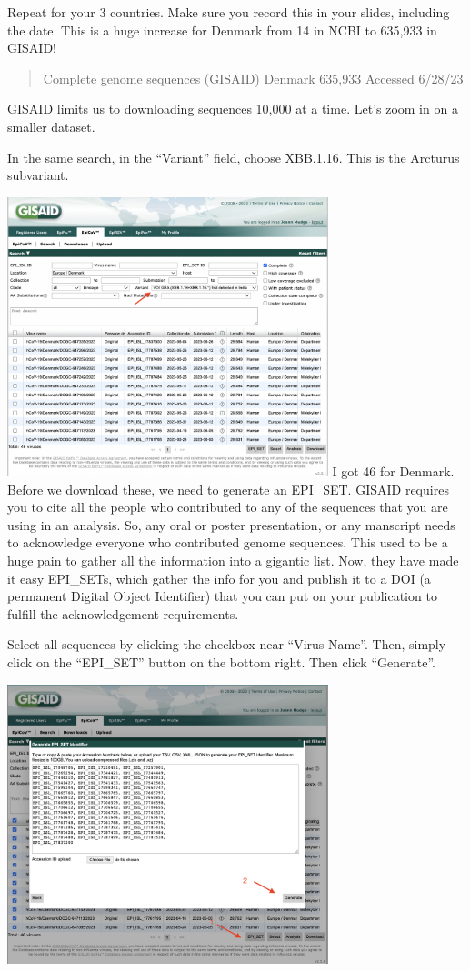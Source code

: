 \documentclass[
]{book}
\begin{document}
Repeat for your 3 countries. Make sure you record this in your slides, including the date. This is a huge increase for Denmark from 14 in NCBI to 635,933 in GISAID!

\begin{quote}
Complete genome sequences (GISAID)
Denmark 635,933
Accessed 6/28/23
\end{quote}

GISAID limits us to downloading sequences 10,000 at a time. Let's zoom in on a smaller dataset.

In the same search, in the ``Variant'' field, choose XBB.1.16. This is the Arcturus subvariant.

\includegraphics[width=0.7\textwidth,height=\textheight]{./Figures/gisaidSearch.png}
I got 46 for Denmark. Before we download these, we need to generate an EPI\_SET. GISAID requires you to cite all the people who contributed to any of the sequences that you are using in an analysis. So, any oral or poster presentation, or any manscript needs to acknowledge everyone who contributed genome sequences. This used to be a huge pain to gather all the information into a gigantic list. Now, they have made it easy EPI\_SETs, which gather the info for you and publish it to a DOI (a permanent Digital Object Identifier) that you can put on your publication to fulfill the acknowledgement requirements.

Select all sequences by clicking the checkbox near ``Virus Name''. Then, simply click on the ``EPI\_SET'' button on the bottom right. Then click ``Generate''.

\includegraphics[width=0.7\textwidth,height=\textheight]{./Figures/episet.png}
\end{document}
